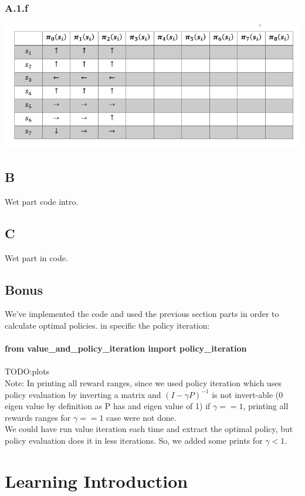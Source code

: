 \documentclass[12pt]{article}
\begin{document}
\subsubsection*{A.1.f}

\includegraphics[]{hw3/plots/A_6.PNG}

\subsection*{B}
Wet part code intro.

\subsection*{C}
Wet part in code.

\subsection*{Bonus}
We've implemented the code and used the previous section parts in order to calculate optimal policies. in specific the policy iteration:\\
\\
\textbf{from value\_and\_policy\_iteration import policy\_iteration}\\

\\TODO:plots
\\
Note: In printing all reward ranges, since we used policy iteration which uses policy evaluation by inverting a matrix and $(I-\gamma P)^{-1}$ is not invert-able (0 eigen value by definition as P has and eigen value of 1) if $\gamma == 1$, printing all rewards ranges for $\gamma == 1$ case were not done.\\
We could have run value iteration each time and extract the optimal policy, but policy evaluation does it in less iterations.
So, we added some prints for $\gamma < 1$.\\

\section*{Learning Introduction}
\end{document}
